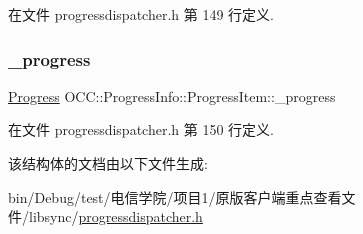 在文件 progressdispatcher.\+h 第 149 行定义.

\mbox{\label{struct_o_c_c_1_1_progress_info_1_1_progress_item_a72b5a8d97ebb564e3967a5d4cc978aa4}} 
\subsubsection{\texorpdfstring{\+\_\+progress}{\_progress}}
{\footnotesize\ttfamily \hyperlink{struct_o_c_c_1_1_progress_info_1_1_progress}{Progress} O\+C\+C\+::\+Progress\+Info\+::\+Progress\+Item\+::\+\_\+progress}



在文件 progressdispatcher.\+h 第 150 行定义.



该结构体的文档由以下文件生成\+:\begin{DoxyCompactItemize}
\item 
bin/\+Debug/test/电信学院/项目1/原版客户端重点查看文件/libsync/\hyperlink{progressdispatcher_8h}{progressdispatcher.\+h}\end{DoxyCompactItemize}

